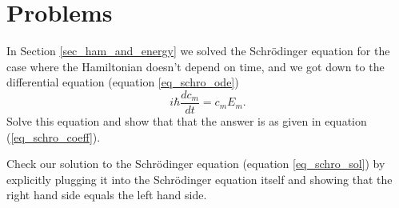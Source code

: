 \section*{Problems}
%

\begin{problem}
\label{prob_solve_schro}

In Section \ref{sec_ham_and_energy} we solved the Schr\"odinger equation for the case where the Hamiltonian doesn't depend on time, and we got down to the differential equation (equation \ref{eq_schro_ode})
\[
i \hbar \frac{dc_m}{dt} = c_m E_m.
\]
Solve this equation and show that that the answer is as given in equation (\ref{eq_schro_coeff}).

\end{problem}

\begin{problem}
\label{prob_check_schro}

Check our solution to the Schr\"odinger equation (equation \ref{eq_schro_sol}) by explicitly plugging it into the Schr\"odinger equation itself and showing that the right hand side equals the left hand side.

\end{problem}

